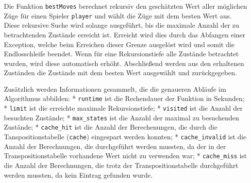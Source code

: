 \documentclass[11pt]{article}
\begin{document}
Die Funktion \texttt{bestMoves} berechnet rekursiv den geschätzten Wert
aller möglichen Züge für einen Spieler \texttt{player} und wählt die
Züge mit dem besten Wert aus. Diese rekursive Suche wird solange
ausgeführt, bis die maximale Anzahl der zu betrachtenden Zustände
erreicht ist. Erreicht wird dies durch das Abfangen einer Exception,
welche beim Erreichen dieser Grenze ausgelöst wird und somit die
Endlosschleife beendet. Wenn für eine Rekursionstiefe alle Zustände
betrachtet wurden, wird diese automatisch erhöht. Abschließend werden
aus den erhaltenen Zuständen die Zustände mit dem besten Wert ausgewählt
und zurückgegeben.

Zusätzlich werden Informationen gesammelt, die die genaueren Abläufe im
Algorithmus abbilden: * \texttt{runtime} ist die Rechendauer der
Funktion in Sekunden; * \texttt{limit} ist die erreichte maximale
Rekursionstiefe; * \texttt{visited} ist die Anzahl der besuchten
Zustände; * \texttt{max\_states} ist die Anzahl der maximal zu
besuchenden Zustände; * \texttt{cache\_hit} ist die Anzahl der
Berechenungen, die durch die Tanspositionstabelle (\texttt{cache})
eingespart werden konnten; * \texttt{cache\_invalid} ist die Anzahl der
Berechnungen, die durchgeführt werden mussten, da der in der
Transpositionstabelle vorhandene Wert nicht zu verwenden war; *
\texttt{cache\_miss} ist die Anzahl der Berechnungen, die trotz der
Transpositionstabelle durchgeführt werden mussten, da kein Eintrag
gefunden wurde.
\end{document}
